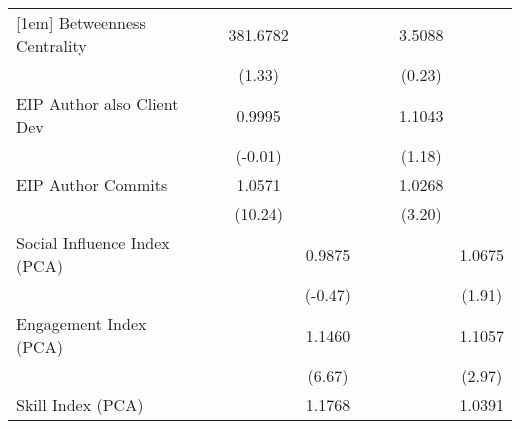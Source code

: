 {\begin{tabular}{l*{8}{c}}
[1em]
Betweenness Centrality             &                     &                     &    381.6782         &                     &                     &                     &      3.5088         &                     \\
                                   &                     &                     &      (1.33)         &                     &                     &                     &      (0.23)         &                     \\
[1em]
EIP Author also Client Dev         &                     &                     &      0.9995         &                     &                     &                     &      1.1043         &                     \\
                                   &                     &                     &     (-0.01)         &                     &                     &                     &      (1.18)         &                     \\
[1em]
EIP Author Commits                 &                     &                     &      1.0571\sym{***}&                     &                     &                     &      1.0268\sym{***}&                     \\
                                   &                     &                     &     (10.24)         &                     &                     &                     &      (3.20)         &                     \\
[1em]
Social Influence Index (PCA)       &                     &                     &                     &      0.9875         &                     &                     &                     &      1.0675\sym{*}  \\
                                   &                     &                     &                     &     (-0.47)         &                     &                     &                     &      (1.91)         \\
[1em]
Engagement Index (PCA)             &                     &                     &                     &      1.1460\sym{***}&                     &                     &                     &      1.1057\sym{***}\\
                                   &                     &                     &                     &      (6.67)         &                     &                     &                     &      (2.97)         \\
[1em]
Skill Index (PCA)                  &                     &                     &                     &      1.1768\sym{***}&                     &                     &                     &      1.0391         \\

\end{tabular}}
